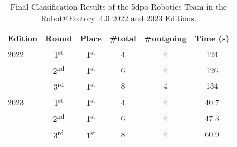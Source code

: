 \begin{table}[t!]

\centering
\caption{Final Classification Results of the 5dpo Robotics Team in the Robot@Factory~4.0 2022 and 2023 Editions.}
\label{tab:results:ratf}



\begin{tabular}{l c c c c c}

\hline
\textbf{Edition} &
\textbf{Round} &
\textbf{Place} &
\textbf{\#total} &
\textbf{\#outgoing} &
\textbf{Time} (s)\\
\hline



2022 &                  %
1\textsuperscript{st} & %
1\textsuperscript{st} & %
4                     & %
4                     & %
124\\
 &                      %
2\textsuperscript{nd} & %
1\textsuperscript{st} & %
6                     & %
4                     & %
126\\
 &                      %
3\textsuperscript{rd} & %
1\textsuperscript{st} & %
8                     & %
4                     & %
134\\
\hline
2023 &                  %
1\textsuperscript{st} & %
1\textsuperscript{st} & %
4                     & %
4                     & %
40.7\\
 &                      %
2\textsuperscript{nd} & %
1\textsuperscript{st} & %
6                     & %
4                     & %
47.3\\
 &                      %
3\textsuperscript{rd} & %
1\textsuperscript{st} & %
8                     & %
4                     & %
60.9\\
\hline



\end{tabular}



\end{table}
